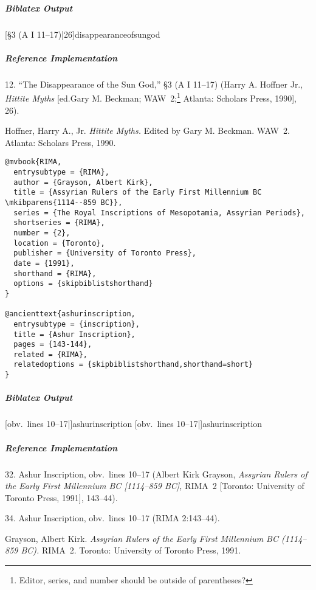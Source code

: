 \documentclass[a4paper]{article}
\newenvironment{biboutput}{%
  \subparagraph{Biblatex Output}
}{\color{black}}
\newenvironment{refimp}{%
  \subparagraph{Reference Implementation}
  \color{reference-colour}
  \rm
}{\par\color{black}}
\begin{document}
\begin{biboutput}
  [§3 (A I 11--17)|26]{disappearanceofsungod}
\end{biboutput}

\begin{refimp}
  \hspace*{\bibindent}12. “The Disappearance of the Sun God,” §3 (A I 11–17)
  (Harry A. Hoffner Jr., \emph{Hittite Myths} [ed.\@ Gary M. Beckman;
  WAW~2;\footnote{Editor, series, and number should be outside of
  parentheses?} Atlanta: Scholars Press, 1990], 26).
  
  \hangindent\bibindent Hoffner, Harry A., Jr. \emph{Hittite Myths.} Edited by
  Gary M. Beckman. WAW~2. Atlanta: Scholars Press, 1990.

\end{refimp}

\medskip

\begin{lstlisting}
@mvbook{RIMA,
  entrysubtype = {RIMA},
  author = {Grayson, Albert Kirk},
  title = {Assyrian Rulers of the Early First Millennium BC \mkibparens{1114--859 BC}},
  series = {The Royal Inscriptions of Mesopotamia, Assyrian Periods},
  shortseries = {RIMA},
  number = {2},
  location = {Toronto},
  publisher = {University of Toronto Press},
  date = {1991},
  shorthand = {RIMA},
  options = {skipbiblistshorthand}
}

@ancienttext{ashurinscription,
  entrysubtype = {inscription},
  title = {Ashur Inscription},
  pages = {143-144},
  related = {RIMA},
  relatedoptions = {skipbiblistshorthand,shorthand=short}
}
\end{lstlisting}

\begin{biboutput}
  [obv.\ lines 10--17|]{ashurinscription}
  [obv.\ lines 10--17|]{ashurinscription}
\end{biboutput}

\begin{refimp}
  \hspace*{\bibindent}32. Ashur Inscription, obv.\ lines 10–17 (Albert Kirk
  Grayson, \emph{Assyrian Rulers of the Early First Millennium BC [1114–859
  BC],} RIMA~2 [Toronto: University of Toronto Press, 1991], 143–44).

  \hspace*{\bibindent}34. Ashur Inscription, obv.\ lines 10–17 (RIMA
  2:143–44).

  \hangindent\bibindent Grayson, Albert Kirk. \emph{Assyrian Rulers of the
  Early First Millennium BC (1114–859 BC).} RIMA~2. Toronto: University of
  Toronto Press, 1991.

\end{refimp}
\end{document}
